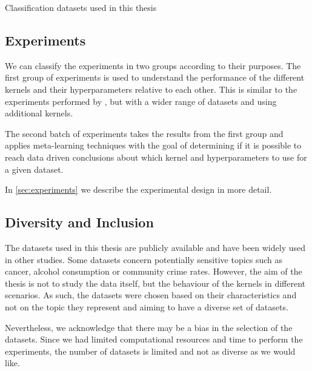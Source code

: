 \begin{table}[H]
    \caption{Classification datasets used in this thesis}
    \label{tab:datasets_classification}
    
\end{table}

\subsection{Experiments}%

We can classify the experiments in two groups according to their purposes. The
first group of experiments is used to understand the performance of the
different kernels and their hyperparameters relative to each other. This is
similar to the experiments performed by
\textcite{frenayParameterinsensitiveKernelExtreme2011}, but with a wider range
of datasets and using additional kernels.

The second batch of experiments takes the results from the first group and
applies meta-learning techniques with the goal of determining if it is possible
to reach data driven conclusions about which kernel and hyperparameters to use
for a given dataset.

In \cref{sec:experiments} we describe the experimental design in more detail.

%

\subsection{Diversity and Inclusion}%

The datasets used in this thesis are publicly available and have been widely
used in other studies. Some datasets concern potentially sensitive topics such
as cancer, alcohol consumption or community crime rates. However, the aim of the
thesis is not to study the data itself, but the behaviour of the kernels in
different scenarios. As such, the datasets were chosen based on their
characteristics and not on the topic they represent and aiming to have a diverse
set of datasets.

Nevertheless, we acknowledge that there may be a bias in the selection of the
datasets. Since we had limited computational resources and time to perform the
experiments, the number of datasets is limited and not as diverse as we would
like.

